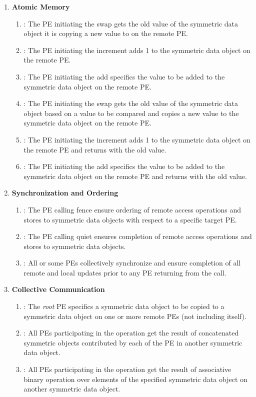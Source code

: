 \begin{enumerate}
\item \textbf{Atomic Memory}
\begin{enumerate}
\item {}: The \ac{PE} initiating the swap gets the old value of the symmetric data object it is copying a new value to on the remote \ac{PE}.
\item {}: The \ac{PE} initiating the increment adds 1 to the symmetric data object on the remote \ac{PE}.
\item {}: The \ac{PE} initiating the add specifics the value to be added to the symmetric data object on the remote \ac{PE}.
\item {}: The \ac{PE} initiating the swap gets the old value of the symmetric data object based on a value to be compared and copies a new value to the symmetric data object on the remote \ac{PE}.
\item {}: The \ac{PE} initiating the increment adds 1 to the symmetric data object on the remote \ac{PE} and returns with the old value.
\item {}: The \ac{PE} initiating the add specifics the value to be added to the symmetric data object on the remote \ac{PE} and returns with the old value.
\end{enumerate}

\item \textbf{Synchronization and Ordering}
\begin{enumerate}
\item {}: The \ac{PE} calling fence ensure ordering of remote access operations and stores to symmetric data objects with respect to a specific target \ac{PE}. 
\item {}: The \ac{PE} calling quiet ensures completion of remote access operations and stores to symmetric data objects. 
\item {}: All or some \ac{PE}s collectively synchronize and ensure completion of all remote and local updates prior to any \ac{PE} returning from the call.
\end{enumerate}

\item \textbf{Collective Communication}
\begin{enumerate}
\item {}: The \textit{root} \ac{PE} specifics a symmetric data object to be copied to a symmetric data object on one or more remote \ac{PE}s (not including itself). 
\item {}: All \ac{PE}s participating in the operation get the result of concatenated symmetric objects contributed by each of the \ac{PE} in another symmetric data object.
\item {}: All \ac{PE}s participating in the operation get the result of associative binary operation over elements of the specified symmetric data object on another symmetric data object. 
\end{enumerate}


\end{enumerate}
